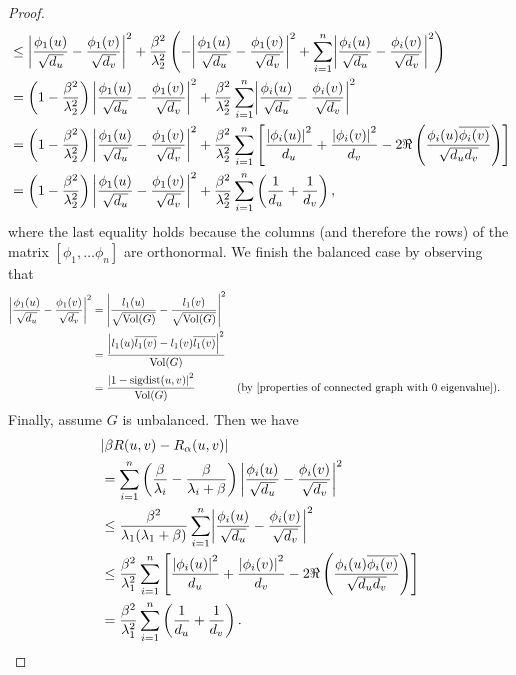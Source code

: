 \documentclass{article}
\theoremstyle{definition}
\DeclarePairedDelimiter\abs{\lvert}{\rvert}
\DeclareMathOperator{\sigdist}{sigdist}
\DeclareMathOperator{\vol}{Vol}
\begin{document}
\begin{proof}
\begin{align*}
&\leq \abs*{\frac{\phi_1(u)}{\sqrt{d_u}} - \frac{\phi_1(v)}{\sqrt{d_v}}}^2 + \frac{\beta^2}{\lambda_2^2} \left( -\abs*{\frac{\phi_1(u)}{\sqrt{d_u}} - \frac{\phi_1(v)}{\sqrt{d_v}}}^2 + \sum_{i=1}^n \abs*{\frac{\phi_i(u)}{\sqrt{d_u}} - \frac{\phi_i(v)}{\sqrt{d_v}}}^2 \right) \\
&= \left( 1 - \frac{\beta^2}{\lambda_2^2} \right) \abs*{\frac{\phi_1(u)}{\sqrt{d_u}} - \frac{\phi_1(v)}{\sqrt{d_v}}}^2 + \frac{\beta^2}{\lambda_2^2} \sum_{i=1}^n \abs*{\frac{\phi_i(u)}{\sqrt{d_u}} - \frac{\phi_i(v)}{\sqrt{d_v}}}^2 \\
&= \left( 1 - \frac{\beta^2}{\lambda_2^2} \right) \abs*{\frac{\phi_1(u)}{\sqrt{d_u}} - \frac{\phi_1(v)}{\sqrt{d_v}}}^2 + \frac{\beta^2}{\lambda_2^2} \sum_{i=1}^n \left[ \frac{\abs*{\phi_i(u)}^2}{d_u} + \frac{\abs*{\phi_i(v)}^2}{d_v} - 2 \Re \left( \frac{\phi_i(u) \overline{\phi_i(v)}}{\sqrt{d_u d_v}} \right) \right] \\
&= \left( 1 - \frac{\beta^2}{\lambda_2^2} \right) \abs*{\frac{\phi_1(u)}{\sqrt{d_u}} - \frac{\phi_1(v)}{\sqrt{d_v}}}^2 + \frac{\beta^2}{\lambda_2^2} \sum_{i=1}^n \left( \frac{1}{d_u} + \frac{1}{d_v} \right),
\end{align*}
where the last equality holds because the columns (and therefore the rows) of the matrix $[\phi_1, \dots \phi_n]$ are orthonormal. We finish the balanced case by observing that
\begin{align*}
\abs*{\frac{\phi_1(u)}{\sqrt{d_u}} - \frac{\phi_1(v)}{\sqrt{d_v}}}^2
&= \abs*{\frac{l_1(u)}{\sqrt{\vol(G)}} - \frac{l_1(v)}{\sqrt{\vol(G)}}}^2 \\
&= \frac{\abs*{l_1(u) \overline{l_1(v)} - l_1(v) \overline{l_1(v)}}^2}{\vol(G)} \\
&= \frac{\abs*{1 - \sigdist(u, v)}^2}{\vol(G)} && \text{(by \cref{properties of connected graph with 0 eigenvalue})}.
\end{align*}
Finally, assume $G$ is unbalanced. Then we have
\begin{align*}
&\abs*{\beta R(u, v) - R_\alpha (u, v)} \\
&= \sum_{i=1}^n \left( \frac{\beta}{\lambda_i} - \frac{\beta}{\lambda_i + \beta} \right) \abs*{\frac{\phi_i(u)}{\sqrt{d_u}} - \frac{\phi_i(v)}{\sqrt{d_v}}}^2 \\
&\leq \frac{\beta^2}{\lambda_1(\lambda_1 + \beta)} \sum_{i=1}^n \abs*{\frac{\phi_i(u)}{\sqrt{d_u}} - \frac{\phi_i(v)}{\sqrt{d_v}}}^2 \\
&\leq \frac{\beta^2}{\lambda_1^2} \sum_{i=1}^n \left[ \frac{\abs*{\phi_i(u)}^2}{d_u} + \frac{\abs*{\phi_i(v)}^2}{d_v} - 2 \Re \left( \frac{\phi_i(u) \overline{\phi_i(v)}}{\sqrt{d_u d_v}} \right) \right] \\
&= \frac{\beta^2}{\lambda_1^2} \sum_{i=1}^n \left( \frac{1}{d_u} + \frac{1}{d_v} \right).
\end{align*}
\end{proof}
\end{document}
